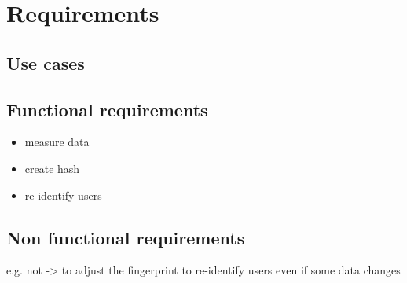 \chapter{Requirements}
\label{cha:requirements}

\section{Use cases}

\section{Functional requirements}

\begin{itemize}
\item{measure data}
\item{create hash}
\item{re-identify users}
\end{itemize}

\section{Non functional requirements}

e.g. not -> to adjust the fingerprint to re-identify users even if some data changes